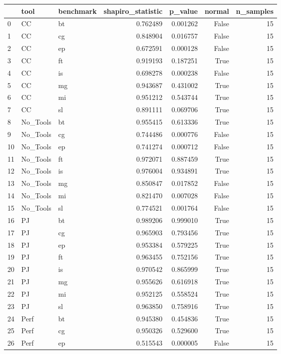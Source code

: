 \begin{tabular}{lllrrrr}
\toprule
 & tool & benchmark & shapiro_statistic & p_value & normal & n_samples \\
\midrule
0 & CC & bt & 0.762489 & 0.001262 & False & 15 \\
1 & CC & cg & 0.848904 & 0.016757 & False & 15 \\
2 & CC & ep & 0.672591 & 0.000128 & False & 15 \\
3 & CC & ft & 0.919193 & 0.187251 & True & 15 \\
4 & CC & is & 0.698278 & 0.000238 & False & 15 \\
5 & CC & mg & 0.943687 & 0.431002 & True & 15 \\
6 & CC & mi & 0.951212 & 0.543744 & True & 15 \\
7 & CC & sl & 0.891111 & 0.069706 & True & 15 \\
8 & No_Tools & bt & 0.955415 & 0.613336 & True & 15 \\
9 & No_Tools & cg & 0.744486 & 0.000776 & False & 15 \\
10 & No_Tools & ep & 0.741274 & 0.000712 & False & 15 \\
11 & No_Tools & ft & 0.972071 & 0.887459 & True & 15 \\
12 & No_Tools & is & 0.976004 & 0.934891 & True & 15 \\
13 & No_Tools & mg & 0.850847 & 0.017852 & False & 15 \\
14 & No_Tools & mi & 0.821470 & 0.007028 & False & 15 \\
15 & No_Tools & sl & 0.774521 & 0.001764 & False & 15 \\
16 & PJ & bt & 0.989206 & 0.999010 & True & 15 \\
17 & PJ & cg & 0.965903 & 0.793456 & True & 15 \\
18 & PJ & ep & 0.953384 & 0.579225 & True & 15 \\
19 & PJ & ft & 0.963455 & 0.752156 & True & 15 \\
20 & PJ & is & 0.970542 & 0.865999 & True & 15 \\
21 & PJ & mg & 0.955626 & 0.616918 & True & 15 \\
22 & PJ & mi & 0.952125 & 0.558524 & True & 15 \\
23 & PJ & sl & 0.963850 & 0.758916 & True & 15 \\
24 & Perf & bt & 0.945380 & 0.454836 & True & 15 \\
25 & Perf & cg & 0.950326 & 0.529600 & True & 15 \\
26 & Perf & ep & 0.515543 & 0.000005 & False & 15 \\

\end{tabular}
